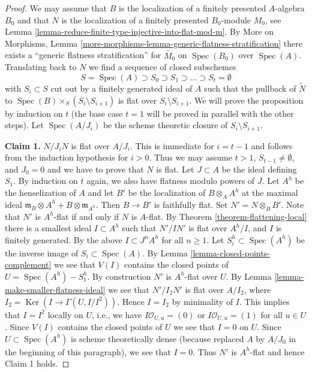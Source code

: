 \documentclass{amsart}
\theoremstyle{plain}
\theoremstyle{definition}
\theoremstyle{remark}
\numberwithin{equation}{subsection}
\def\Spec{\mathop{\mathrm{Spec}}}
\def\Ker{\mathop{\mathrm{Ker}}}
\begin{document}
\begin{proof}
We may assume that $B$ is the localization of a finitely presented
$A$-algebra $B_0$ and that $N$ is the localization of a
finitely presented $B_0$-module $M_0$, see
Lemma \ref{lemma-reduce-finite-type-injective-into-flat-mod-m}.
By More on Morphisms, Lemma
\ref{more-morphisms-lemma-generic-flatness-stratification}
there exists a ``generic flatness stratification''
for $\widetilde{M_0}$ on $\Spec(B_0)$ over $\Spec(A)$.
Translating back to $N$ we find a sequence of closed subschemes
$$
S = \Spec(A) \supset S_0 \supset S_1 \supset \ldots \supset S_t = \emptyset
$$
with $S_i \subset S$ cut out by a finitely generated ideal of $A$
such that the pullback of $\widetilde{N}$ to
$\Spec(B) \times_S (S_i \setminus S_{i + 1})$ is flat over
$S_i \setminus S_{i + 1}$. We will prove the proposition by
induction on $t$ (the base case $t = 1$ will be proved in parallel
with the other steps). Let $\Spec(A/J_i)$ be the scheme theoretic
closure of $S_i \setminus S_{i + 1}$.

\medskip\noindent
{\bf Claim 1.} $N/J_iN$ is flat over $A/J_i$. This is immediate for
$i = t - 1$ and follows from the induction hypothesis for $i > 0$.
Thus we may assume $t > 1$, $S_{t - 1} \not = \emptyset$, and
$J_0 = 0$ and we have to prove that $N$ is flat. Let $J \subset A$
be the ideal defining $S_1$. By induction on $t$ again, we also
have flatness modulo powers of $J$. Let $A^h$ be the henselization of $A$
and let $B'$ be the localization of $B \otimes_A A^h$ at the maximal ideal
$\mathfrak m_B \otimes A^h + B \otimes \mathfrak m_{A^h}$. Then $B \to B'$
is faithfully flat. Set $N' = N \otimes_B B'$. Note that $N'$
is $A^h$-flat if and only if $N$ is $A$-flat. By
Theorem \ref{theorem-flattening-local} there is a smallest ideal
$I \subset A^h$ such that $N'/IN'$ is flat over $A^h/I$, and
$I$ is finitely generated. By the above $I \subset J^nA^h$ for
all $n \geq 1$. Let $S_i^h \subset \Spec(A^h)$ be the inverse image
of $S_i \subset \Spec(A)$. By Lemma \ref{lemma-closed-points-complement}
we see that $V(I)$ contains the closed points of $U = \Spec(A^h) - S_1^h$.
By construction $N'$ is $A^h$-flat over $U$.
By Lemma \ref{lemma-make-smaller-flatness-ideal} we see that $N'/I_2N'$
is flat over $A/I_2$, where
$I_2 = \Ker(I \to \Gamma(U, I/I^2))$. Hence $I = I_2$ by minimality
of $I$. This implies that $I = I^2$ locally on $U$, i.e.,
we have $I\mathcal{O}_{U, u} = (0)$ or $I\mathcal{O}_{U, u} = (1)$
for all $u \in U$. Since $V(I)$ contains the closed points of $U$
we see that $I = 0$ on $U$. Since $U \subset \Spec(A^h)$ is scheme
theoretically dense (because replaced $A$ by $A/J_0$ in the beginning
of this paragraph), we see that $I = 0$. Thus $N'$ is $A^h$-flat
and hence Claim 1 holds.


\end{proof}
\end{document}
